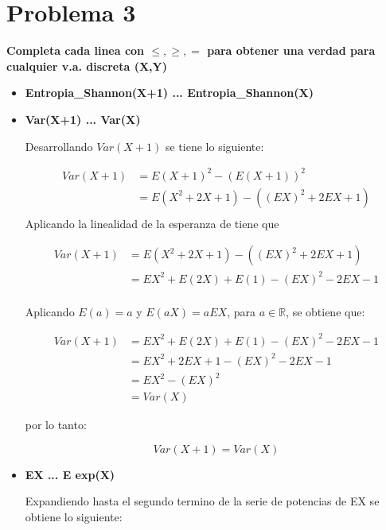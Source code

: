 \section*{Problema 3}

\textbf{Completa cada linea con $\leq , \geq, =$ para obtener una verdad para cualquier v.a. discreta (X,Y)}
\begin{itemize}
    \item \textbf{Entropia\_Shannon(X+1) ... Entropia\_Shannon(X)}
    \item \textbf{Var(X+1) ... Var(X)}

          Desarrollando $Var(X+1)$ se tiene lo siguiente:

          \begin{align*}
              Var(X+1) & = E(X+1)^2-(E(X+1))^2         \\
                       & = E(X^2+2X+1)- ((EX)^2+2EX+1) \\
          \end{align*}
          Aplicando la linealidad de la esperanza de tiene que

          \begin{align*}
              Var(X+1) & =E(X^2+2X+1)- ((EX)^2+2EX+1)           \\
                       & = EX^2 + E(2X) + E(1) - (EX)^2 -2EX -1 \\
          \end{align*}


          Aplicando $E(a)=a$ y $E(aX)=aEX$, para $a\in \mathbb{R}$, se obtiene que:

          \begin{align*}
              Var(X+1) & = EX^2 + E(2X) + E(1) - (EX)^2 -2EX -1 \\
                       & = EX^2 +2EX +1 -(EX)^2 -2EX -1         \\
                       & = EX^2 -(EX)^2                         \\
                       & = Var(X)
          \end{align*}

          por lo tanto:

          \begin{equation*}
              Var(X+1) = Var(X)
          \end{equation*}
    \item \textbf{EX ... E exp(X)}

          Expandiendo hasta el segundo termino de la serie de potencias de EX se obtiene lo siguiente:


\end{itemize}
